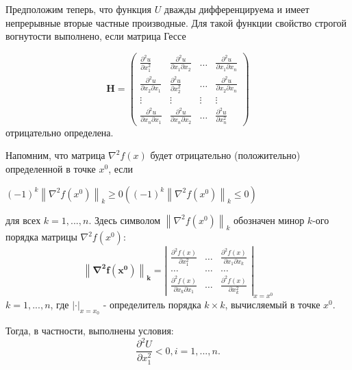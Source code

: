 \documentclass[12pt, 4paper]{book}
\begin{document}
{Предположим теперь, что функция $U$ дважды дифференцируема и имеет непрерывные вторые частные производные. Для такой функции свойство строгой вогнутости выполнено, если матрица Гессе

\begin{displaymath}
\mathbf{H} =
\left( \begin{array}{cccc}
\frac{\partial^{2}u}{\partial x_{1}^{2}} & \frac{\partial^{2}u}{\partial x_{1} \partial x_{2}} & \ldots & \frac{\partial^{2}u}{\partial x_{1} \partial x_{n}} \\
\frac{\partial^{2}u}{\partial x_{2} \partial x_{1}} & \frac{\partial^{2}u}{\partial x_{2}^{2}} & \ldots & \frac{\partial^{2}u}{\partial x_{2} \partial x_{n}} \\
\vdots & \vdots & \vdots & \vdots\\
\frac{\partial^{2}u}{\partial x_{n} \partial x_{1}} & \frac{\partial^{2}u}{\partial x_{n} \partial x_{2}} & \ldots & \frac{\partial^{2}u}{\partial x_{n}^{2}}
\end{array} \right)
\end{displaymath}
отрицательно определена.

Напомним, что матрица $\nabla^{2}f(x)$ будет отрицательно (положительно) определенной в точке $x^0$, если
\begin{center}
$(-1)^{k} \left\|\nabla^{2}f(x^0)\right\|_k \geq 0 \left((-1)^{k}\left\|\nabla^{2}f(x^0)\right\|_k \leq 0 \right)$
\end{center}
для всех $k=1,...,n$. Здесь символом $\left\|\nabla^{2}f(x^0)\right\|_k$ обозначен минор $k$-ого порядка матрицы $\nabla^{2}f(x^0)$:
\begin{displaymath}
\mathbf{\left\|\nabla^{2}f(x^0)\right\|_k} =
\left|\begin{array}{ccc}
\frac{\partial^{2}f(x)}{\partial x_{1}^{2}} & \ldots & \frac{\partial^{2}f(x)}{\partial x_{1} \partial x_{k}} \\
\ldots & \ldots & \ldots\\
\frac{\partial^{2}f(x)}{\partial x_{k} \partial x_{1}} & \ldots & \frac{\partial^{2}f(x)}{\partial x_{k}^{2}}
\end{array} \right|_{x=x^{0}}
\end{displaymath}
$k=1,...,n$, где $\left|\cdot\right|_{x=x_0}$ - определитель порядка $k \times k $, вычисляемый в точке $x^0$.

Тогда, в частности, выполнены условия: 
\begin{equation}
\label{formula2}
\frac{\partial^{2}U}{\partial x_{1}^{2}} < 0,i = 1,...,n.
\end{equation}

}
\end{document}
